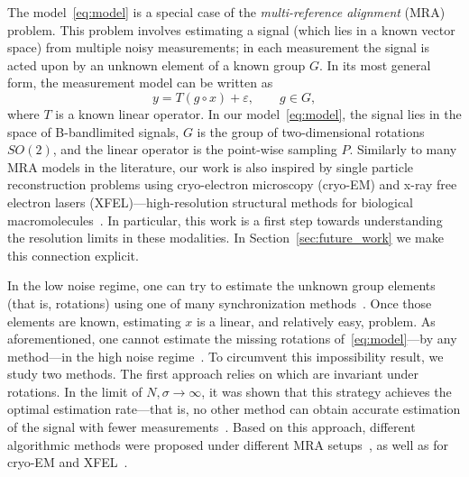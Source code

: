 \documentclass[english,12pt]{article}
\numberwithin{equation}{section}
\numberwithin{thm}{section} %
\begin{document}
The model~\eqref{eq:model} is a special case of the \emph{multi-reference alignment} (MRA) problem. This problem involves estimating a signal (which lies in a known vector space) from multiple noisy measurements; in each measurement the signal is acted upon by an unknown element of a known group $G$. 
In its most general form, the measurement model can be written as 
\begin{equation}
y = T(g\circ x) +\varepsilon, \qquad g\in G,
\end{equation}
where $T$ is a known linear operator. 
In our model~\eqref{eq:model}, the signal lies in the space of B-bandlimited signals, $G$ is the group of two-dimensional rotations $SO(2)$, and the linear operator is the point-wise sampling $P$.
Similarly to many MRA models in the literature,  our work is also inspired by single particle reconstruction problems using cryo-electron microscopy (cryo-EM) and x-ray free electron lasers (XFEL)---high-resolution structural methods for biological macromolecules~\cite{frank2006three,kuhlbrandt2014resolution,singer2018mathematics}. 
In particular, this work is a first step towards understanding the resolution limits in these modalities. In Section~\ref{sec:future_work} we make this connection explicit.

In the low noise regime, one can try to estimate the unknown group elements (that is, rotations) using one of many synchronization methods~\cite{singer2011angular,bandeira2015non,boumal2016nonconvex,chen2018projected,singer2011three}.
Once those elements are known, estimating $x$ is a linear, and relatively easy, problem. 
As aforementioned, one cannot estimate the missing rotations of~\eqref{eq:model}---by any method---in the high noise regime~\cite{bendory2018toward,aguerrebere2016fundamental}.
To circumvent this impossibility result, we study two methods.
The first approach relies on which are invariant 
under rotations. In the limit of $N,\sigma\to\infty$, it was shown that this strategy achieves the optimal  estimation rate---that is, no other method can obtain accurate estimation of the signal with fewer measurements~\cite{bandeira2017optimal,bandeira2017estimation,abbe2018multireference,abbe2018estimation}. Based on this approach, different algorithmic methods were proposed under different MRA setups~\cite{bendory2017bispectrum,perry2017sample,abbe2018multireference,boumal2018heterogeneous,chen2018spectral,ma2018heterogeneous,bandeira2014multireference}, as well as for  cryo-EM and XFEL~\cite{kam1980reconstruction,liu2013three,kurta2017correlations,levin20173d,bendory2018toward,pande2018ab,von2018structure}. 
\end{document}
